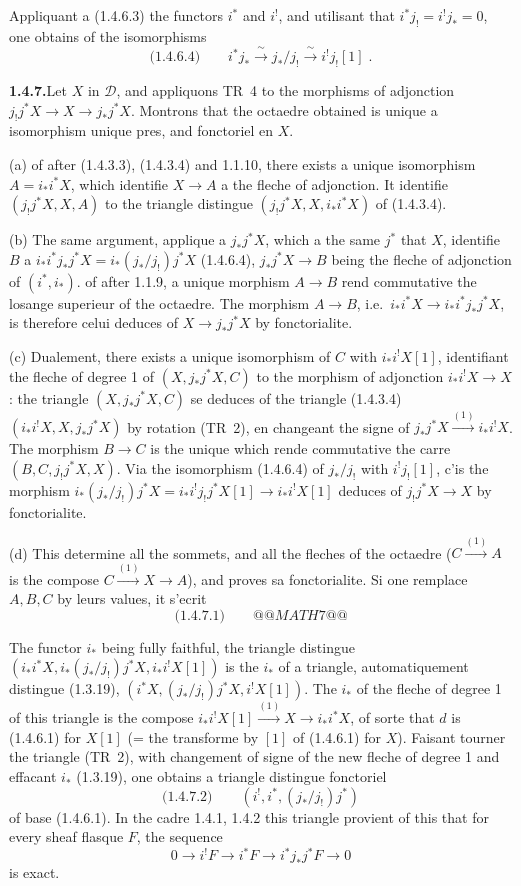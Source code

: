 \documentclass[12pt,a4paper]{article}
\theoremstyle{plain}
\theoremstyle{definition}
\begin{document}
Appliquant a (1.4.6.3) the functors $i^*$ and $i^!$, and utilisant that $i^*j_! = i^!j_* = 0$, one obtains of the isomorphisms
\[
\text{(1.4.6.4)}\qquad i^*j_* \xrightarrow{\;\sim\;} j_*/j_! \xrightarrow{\;\sim\;} i^!j_![1]\;.
\]

\smallskip
\noindent\textbf{1.4.7.}\quad Let $X$ in $\mathcal{D}$, and appliquons TR~4 to the morphisms of adjonction $j_!j^*X \to X \to j_*j^*X$. Montrons that the octaedre obtained is unique a isomorphism unique pres, and fonctoriel en $X$.

(a) of after (1.4.3.3), (1.4.3.4) and 1.1.10, there exists a unique isomorphism $A = i_*i^*X$, which identifie $X \to A$ a the fleche of adjonction. It identifie $(j_!j^*X, X, A)$ to the triangle distingue $(j_!j^*X, X, i_*i^*X)$ of (1.4.3.4).

(b) The same argument, applique a $j_*j^*X$, which a the same $j^*$ that $X$, identifie $B$ a $i_*i^*j_*j^*X = i_*(j_*/j_!)j^*X$ (1.4.6.4), $j_*j^*X \to B$ being the fleche of adjonction of $(i^*, i_*)$. of after 1.1.9, a unique morphism $A \to B$ rend commutative the losange superieur of the octaedre. The morphism $A \to B$, i.e.\ $i_*i^*X \to i_*i^*j_*j^*X$, is therefore celui deduces of $X \to j_*j^*X$ by fonctorialite.

(c) Dualement, there exists a unique isomorphism of $C$ with $i_*i^!X[1]$, identifiant the fleche of degree 1 of $(X, j_*j^*X, C)$ to the morphism of adjonction $i_*i^!X \to X$: the triangle $(X, j_*j^*X, C)$ se deduces of the triangle (1.4.3.4) $(i_*i^!X, X, j_*j^*X)$ by rotation (TR~2), en changeant the signe of $j_*j^*X \xrightarrow{(1)} i_*i^!X$. The morphism $B \to C$ is the unique which rende commutative the carre $(B, C, j_!j^*X, X)$. Via the isomorphism (1.4.6.4) of $j_*/j_!$ with $i^!j_![1]$, c'is the morphism $i_*(j_*/j_!)j^*X = i_*i^!j_!j^*X[1] \to i_*i^!X[1]$ deduces of $j_!j^*X \to X$ by fonctorialite.

(d) This determine all the sommets, and all the fleches of the octaedre ($C \xrightarrow{(1)} A$ is the compose $C \xrightarrow{(1)} X \to A$), and proves sa fonctorialite. Si one remplace $A, B, C$ by leurs values, it s'ecrit
\[
\text{(1.4.7.1)}\qquad
@@MATH7@@
\]

The functor $i_*$ being fully faithful, the triangle distingue $(i_*i^*X, i_*(j_*/j_!)j^*X, i_*i^!X[1])$ is the $i_*$ of a triangle, automatiquement distingue (1.3.19), $(i^*X, (j_*/j_!)j^*X, i^!X[1])$. The $i_*$ of the fleche of degree 1 of this triangle is the compose $i_*i^!X[1] \xrightarrow{(1)} X \to i_*i^*X$, of sorte that $d$ is (1.4.6.1) for $X[1]$ (= the transforme by $[1]$ of (1.4.6.1) for $X$). Faisant tourner the triangle (TR~2), with changement of signe of the new fleche of degree 1 and effacant $i_*$ (1.3.19), one obtains a triangle distingue fonctoriel
\[
\text{(1.4.7.2)}\qquad (i^!, i^*, (j_*/j_!)j^*)
\]
of base (1.4.6.1). In the cadre 1.4.1, 1.4.2 this triangle provient of this that for every sheaf flasque $F$, the sequence
\[
0 \to i^!F \to i^*F \to i^*j_*j^*F \to 0
\]
is exact.
\end{document}
